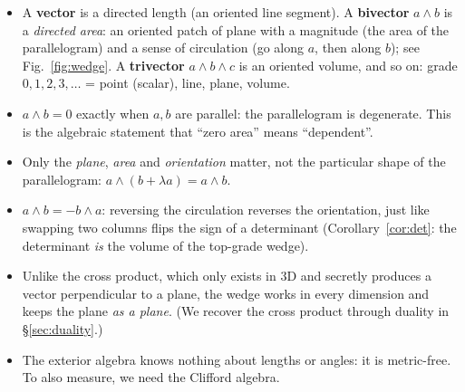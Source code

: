 \begin{intuition}
\begin{itemize}
  \item A \textbf{vector} is a directed length (an oriented line segment). A \textbf{bivector} $a\wedge b$ is a \emph{directed area}: an
  oriented patch of plane with a magnitude (the area of the parallelogram) and a sense of circulation (go along $a$, then along $b$);
  see Fig.~\ref{fig:wedge}. A \textbf{trivector} $a\wedge b\wedge c$ is an oriented volume, and so on: grade $0,1,2,3,\dots$ = point (scalar), line, plane, volume.
  \item $a\wedge b=0$ exactly when $a,b$ are parallel: the parallelogram is degenerate. This is the algebraic statement that ``zero area'' means ``dependent''.
  \item Only the \emph{plane}, \emph{area} and \emph{orientation} matter, not the particular shape of the parallelogram: $a\wedge(b+\lambda a)=a\wedge b$.
  \item $a\wedge b=-b\wedge a$: reversing the circulation reverses the orientation, just like swapping two columns flips the sign of a determinant (Corollary~\ref{cor:det}: the determinant \emph{is} the volume of the top-grade wedge).
  \item Unlike the cross product, which only exists in $3$D and secretly produces a vector perpendicular to a plane, the wedge works in every dimension and keeps the plane \emph{as a plane}. (We recover the cross product through duality in \S\ref{sec:duality}.)
  \item The exterior algebra knows nothing about lengths or angles: it is metric-free. To also measure, we need the Clifford algebra.
\end{itemize}
\end{intuition}
